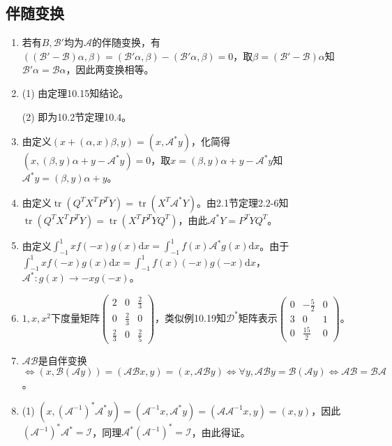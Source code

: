 \documentclass[a4paper,UTF8,fontset=windows]{ctexart}
\DeclareMathOperator{\tr}{tr}
\begin{document}
\subsection{伴随变换}
\begin{enumerate}
\item
若有$B,\mathcal{B}'$均为$\mathcal{A}$的伴随变换，有$((\mathcal{B}'-\mathcal{B})\alpha,\beta)=(\mathcal{B}'\alpha,\beta)-(\mathcal{B}'\alpha,\beta)=0$，取$\beta=(\mathcal{B}'-\mathcal{B})\alpha$知$\mathcal{B}'\alpha=\mathcal{B}\alpha$，因此两变换相等。

\item
(1) 由定理10.15知结论。

(2) 即为10.2节定理10.4。

\item
由定义$(x+(\alpha,x)\beta,y)=(x,\mathcal{A}^*y)$，化简得$(x,(\beta,y)\alpha+y-\mathcal{A}^*y)=0$，取$x=(\beta,y)\alpha+y-\mathcal{A}^*y$知$\mathcal{A}^*y=(\beta,y)\alpha+y$。

\item
由定义$\tr(Q^TX^TP^TY)=\tr(X^T\mathcal{A}^*Y)$。由2.1节定理2.2-6知$\tr(Q^TX^TP^TY)=\tr(X^TP^TYQ^T)$，由此$\mathcal{A}^*Y=P^TYQ^T$。

\item
由定义$\int_{-1}^1xf(-x)g(x)\mathrm{d}x=\int_{-1}^1f(x)\mathcal{A}^*g(x)\mathrm{d}x$。由于$\int_{-1}^1xf(-x)g(x)\mathrm{d}x=\int_{-1}^1f(x)(-x)g(-x)\mathrm{d}x$，$\mathcal{A}^*:g(x)\to-xg(-x)$。

\item
$1,x,x^2$下度量矩阵$\begin{pmatrix}2&0&\frac{2}{3}\\[2ex]0&\frac{2}{3}&0\\[2ex]\frac{2}{3}&0&\frac{2}{5}\end{pmatrix}$，类似例10.19知$\mathcal{D}^*$矩阵表示$\begin{pmatrix}0&-\frac{5}{2}&0\\3&0&1\\0&\frac{15}{2}&0\end{pmatrix}$。

\item
$\mathcal{A}\mathcal{B}$是自伴变换$\Leftrightarrow(x,\mathcal{B}(\mathcal{A}y))=(\mathcal{A}\mathcal{B}x,y)=(x,\mathcal{A}\mathcal{B}y)\Leftrightarrow\forall y,\mathcal{A}\mathcal{B}y=\mathcal{B}(\mathcal{A}y)\Leftrightarrow\mathcal{A}\mathcal{B}=\mathcal{B}\mathcal{A}$。

\item
(1) $(x,(\mathcal{A}^{-1})^*\mathcal{A}^*y)=(\mathcal{A}^{-1}x,\mathcal{A}^*y)=(\mathcal{A}\mathcal{A}^{-1}x,y)=(x,y)$，因此$(\mathcal{A}^{-1})^*\mathcal{A}^*=\mathcal{I}$，同理$\mathcal{A}^*(\mathcal{A}^{-1})^*=\mathcal{I}$，由此得证。


\end{enumerate}
\end{document}

